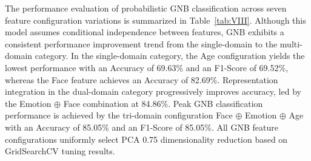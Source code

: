 The performance evaluation of probabilistic GNB classification across seven feature configuration variations is summarized in Table~\ref{tab:VIII}. Although this model assumes conditional independence between features, GNB exhibits a consistent performance improvement trend from the single-domain to the multi-domain category. In the single-domain category, the Age configuration yields the lowest performance with an Accuracy of 69.63\% and an F1-Score of 69.52\%, whereas the Face feature achieves an Accuracy of 82.69\%. Representation integration in the dual-domain category progressively improves accuracy, led by the Emotion $\oplus$ Face combination at 84.86\%. Peak GNB classification performance is achieved by the tri-domain configuration Face $\oplus$ Emotion $\oplus$ Age with an Accuracy of 85.05\% and an F1-Score of 85.05\%. All GNB feature configurations uniformly select PCA 0.75 dimensionality reduction based on GridSearchCV tuning results.

